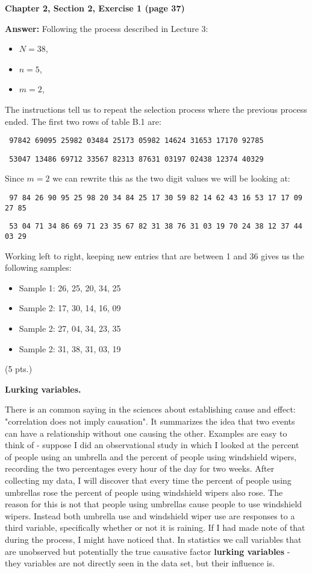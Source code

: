 \documentclass[11pt]{article}
\newcommand{\ans}[1]{{\color{blue} \textbf{Answer: } #1 (5 pts.)}}
\begin{document}
\item \textbf{Chapter 2, Section 2, Exercise 1 (page 37)}

\ans{Following the process described in Lecture 3:

   \begin{itemize}
      \item  $ N = 38$,
      \item  $ n = 5$,
      \item  $ m = 2$,
   \end{itemize}

   The instructions tell us to repeat the selection process where the previous process ended. 
   The first two rows of table B.1 are: 

   \texttt{    97842 69095 25982 03484 25173 05982 14624 31653 17170 92785} 

   \texttt{    53047 13486 69712 33567 82313 87631 03197 02438 12374 40329}

   Since $m = 2$ we can rewrite this as the two digit values we will be looking at:

   \texttt{    97 84 26 90 95 25 98 20 34 84 25 17 30 59 82 14 62 43 16 53 17 17 09 27 85 } 

   \texttt{    53 04 71 34 86 69 71 23 35 67 82 31 38 76 31 03 19 70 24 38 12 37 44 03 29 }

   Working left to right, keeping new entries that are between 1 and 36 gives us the following samples:

   \begin{itemize}
      \item Sample 1:  26, 25, 20, 34, 25
      \item Sample 2:  17, 30, 14, 16, 09
      \item Sample 2:  27, 04, 34, 23, 35
      \item Sample 2:  31, 38, 31, 03, 19
   \end{itemize}

}

\item \textbf{Lurking variables.}

   There is an common saying in the sciences about establishing cause and effect: "correlation does not imply causation". 
   It summarizes the idea that two events can have a relationship without one causing the other.
   Examples are easy to think of - suppose I did an observational study in which I looked at the percent of people using an umbrella and the percent of people using windshield wipers, recording the two percentages every hour of the day for two weeks.
   After collecting my data, I will discover that every time the percent of people using umbrellas rose the percent of people using windshield wipers also rose. 
   The reason for this is not that people using umbrellas cause people to use windshield wipers.
   Instead both umbrella use and windshield wiper use are responses to a third variable, specifically whether or not it is raining.
   If I had made note of that during the process, I might have noticed that.
   In statistics we call variables that are unobserved but potentially the true causative factor \textbf{lurking variables} - they variables are not directly seen in the data set, but their influence is.
\end{document}
